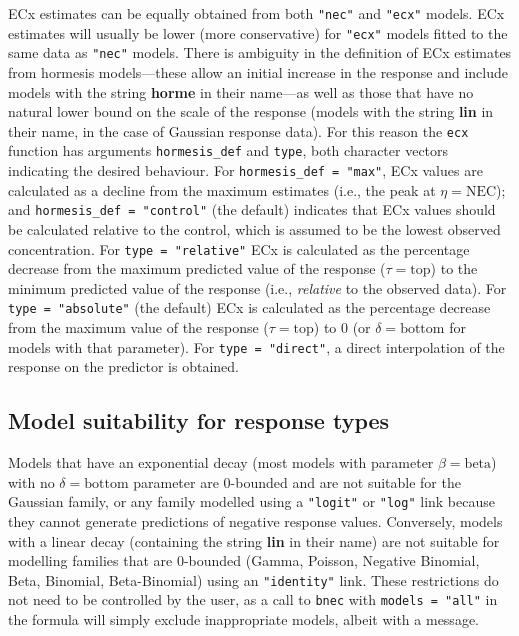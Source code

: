 \documentclass[
  shortnames]{jss}
\begin{document}
ECx estimates can be equally obtained from both \texttt{"nec"} and \texttt{"ecx"} models. ECx estimates will usually be lower (more conservative) for \texttt{"ecx"} models fitted to the same data as \texttt{"nec"} models. There is ambiguity in the definition of ECx estimates from hormesis models---these allow an initial increase in the response \citep[see][]{Mattson2008} and include models with the string \textbf{horme} in their name---as well as those that have no natural lower bound on the scale of the response (models with the string \textbf{lin} in their name, in the case of Gaussian response data). For this reason the \texttt{ecx} function has arguments \texttt{hormesis\_def} and \texttt{type}, both character vectors indicating the desired behaviour. For \texttt{hormesis\_def\ =\ "max"}, ECx values are calculated as a decline from the maximum estimates (i.e., the peak at \(\eta = \text{NEC}\)); and \texttt{hormesis\_def\ =\ "control"} (the default) indicates that ECx values should be calculated relative to the control, which is assumed to be the lowest observed concentration. For \texttt{type\ =\ "relative"} ECx is calculated as the percentage decrease from the maximum predicted value of the response (\(\tau = \text{top}\)) to the minimum predicted value of the response (i.e., \emph{relative} to the observed data). For \texttt{type\ =\ "absolute"} (the default) ECx is calculated as the percentage decrease from the maximum value of the response (\(\tau = \text{top}\)) to 0 (or \(\delta = \text{bottom}\) for models with that parameter). For \texttt{type\ =\ "direct"}, a direct interpolation of the response on the predictor is obtained.

\hypertarget{model-suitability-for-response-types}{%
\subsection{Model suitability for response types}\label{model-suitability-for-response-types}}

Models that have an exponential decay (most models with parameter \(\beta = \text{beta}\)) with no \(\delta = \text{bottom}\) parameter are 0-bounded and are not suitable for the Gaussian family, or any family modelled using a \texttt{"logit"} or \texttt{"log"} link because they cannot generate predictions of negative response values. Conversely, models with a linear decay (containing the string \textbf{lin} in their name) are not suitable for modelling families that are 0-bounded (Gamma, Poisson, Negative Binomial, Beta, Binomial, Beta-Binomial) using an \texttt{"identity"} link. These restrictions do not need to be controlled by the user, as a call to \texttt{bnec} with \texttt{models\ =\ "all"} in the formula will simply exclude inappropriate models, albeit with a message.
\end{document}
